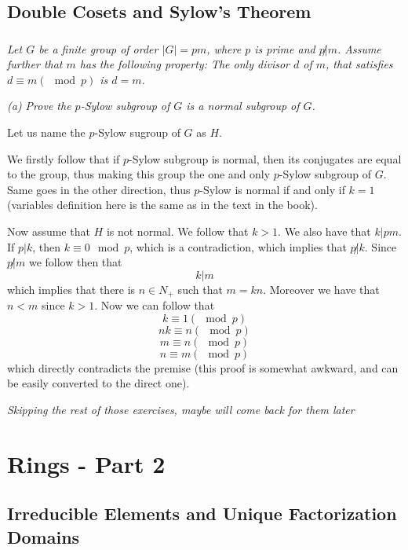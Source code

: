 \documentclass[11pt,oneside,titlepage]{book}
\begin{document}
\section{Double Cosets and Sylow's Theorem}

\subsection{}

\textit{Let $G$ be a finite group of order $|G| = pm$, where $p$ is
  prime and $p \not | m$. Assume further that $m$ has the following
  property: The only divisor $d$ of $m$, that satisfies $d \equiv m
  (\mod p)$ is $d = m$.}

\textit{(a) Prove the $p$-Sylow subgroup of $G$ is a normal subgroup
  of $G$.}

Let us name the $p$-Sylow sugroup of $G$ as $H$.

We firstly follow that if $p$-Sylow subgroup is normal, then its
conjugates are equal to the group, thus making this group the one
and only $p$-Sylow subgroup of $G$. Same goes in the other
direction, thus $p$-Sylow is normal if and only if $k = 1$ (variables
definition here is the same as in the text in the book).

Now assume that $H$ is not normal. We follow that $k > 1$. We also
have that $k | pm$. If $p | k$, then $k \equiv 0 \mod p$, which is a
contradiction, which implies that $p \not | k$. Since $p \not | m$
we follow then that
$$k | m$$
which implies that there is $n \in N_+$ such that $m = kn$. Moreover
we have that $n < m$ since $k > 1$. Now we can follow that
$$k \equiv 1 (\mod p)$$
$$nk \equiv n (\mod p)$$
$$m \equiv n (\mod p)$$
$$n \equiv m (\mod p)$$
which directly contradicts the premise (this proof is somewhat
awkward, and can be easily converted to the direct one).



\textit{Skipping the rest of those exercises, maybe will come back for
  them later}

\chapter{Rings - Part 2}

\section{Irreducible Elements and Unique Factorization Domains}

\subsection{}
\end{document}
